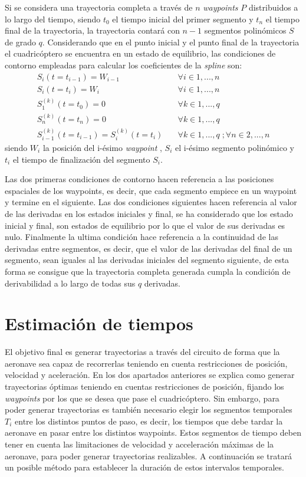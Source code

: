 Si se considera una trayectoria completa a través de $n$ \textit{waypoints} $P$ distribuidos a lo largo del tiempo, siendo $t_0$ el tiempo inicial del primer segmento y $t_n$ el tiempo final de la trayectoria, la trayectoria contará con $n-1$ segmentos polinómicos $S$ de grado $q$. Considerando que en el punto inicial y el punto final de la trayectoria el cuadricóptero se encuentra en un estado de equilibrio, las condiciones de contorno empleadas para calcular los coeficientes de la \textit{spline} son:
\begin{equation}
\begin{array}{ll}
	S_i (t = t_{i-1}) = W_{i-1} \quad &\forall i \in 1,...,n\\
	S_i (t = t_{i}) = W_i \quad &\forall i \in 1,...,n\\
	S_1^{(k)}(t = t_0) = 0 \quad &\forall k \in 1,...,q\\
	S_n^{(k)}(t = t_n) = 0 \quad &\forall k \in 1,...,q\\
	S_{i-1}^{(k)}(t = t_{i-1}) = S_{i}^{(k)}(t = t_{i})  \quad &\forall k \in 1,...,q \;; \forall n \in 2,...,n
\end{array}
\end{equation}
 siendo $W_i$ la posición del i-ésimo \textit{waypoint} , $S_i$ el i-ésimo segmento polinómico y  $t_i$ el tiempo de finalización del segmento $S_i$.
 
 Las dos primeras condiciones de contorno hacen referencia a las posiciones espaciales de los waypoints, es decir, que cada segmento empiece en un waypoint  y termine en el siguiente. Las dos condiciones siguientes hacen referencia al valor de las derivadas en los estados iniciales y final, se ha considerado que los estado inicial y final, son estados de equilibrio por lo que el valor de sus derivadas es nulo. Finalmente la ultima condición hace referencia a la continuidad de las derivadas entre segmentos, es decir, que el valor de las derivadas del final de un segmento, sean iguales al las derivadas iniciales del segmento siguiente, de esta forma se consigue que la trayectoria completa generada cumpla la condición de derivabilidad a lo largo de todas sus $q$ derivadas.

\section{Estimación de tiempos}

El objetivo final es generar trayectorias a través del circuito de forma que la aeronave sea capaz de recorrerlas teniendo en cuenta restricciones de posición, velocidad y aceleración. En los dos apartados anteriores se explica como generar trayectorias óptimas teniendo en cuentas restricciones de posición, fijando los \textit{waypoints} por los que se desea que pase el cuadricóptero. Sin embargo, para poder generar trayectorias es también necesario elegir los segmentos temporales $T_i$ entre los distintos puntos de paso, es decir, los tiempos que debe tardar la aeronave en pasar entre los distintos waypoints. Estos segmentos de tiempo deben tener en cuenta las limitaciones de velocidad y acceleración máximas de la aeronave, para poder generar trayectorias realizables. A continuación se tratará un posible método para establecer la duración de estos intervalos temporales.

